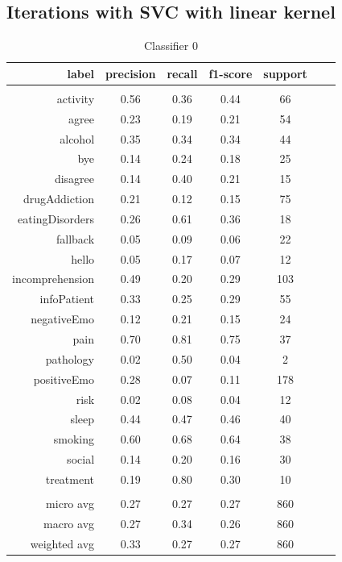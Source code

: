 \documentclass[11pt]{article}
\begin{document}
\subsection{Iterations with SVC with linear kernel}
\begin{table}[htb]
\begin{center}
\begin{tabular}{ |r|c|c|c|c|c|c| }
\hline
label 			& precision & recall & f1-score & support\\ \hline 
\\ \hline 
activity 		&  0.56 & 0.36 & 0.44 &   66\\ \hline 
agree 			&  0.23 & 0.19 & 0.21 &   54\\ \hline 
alcohol 		&  0.35 & 0.34 & 0.34 &   44\\ \hline 
bye 			&  0.14 & 0.24 & 0.18 &   25\\ \hline 
disagree 		&  0.14 & 0.40 & 0.21 &   15\\ \hline 
drugAddiction 	&  0.21 & 0.12 & 0.15 &   75\\ \hline 
eatingDisorders &  0.26 & 0.61 & 0.36 &   18\\ \hline 
fallback 		&  0.05 & 0.09 & 0.06 &   22\\ \hline 
hello 			&  0.05 & 0.17 & 0.07 &   12\\ \hline 
incomprehension &  0.49 & 0.20 & 0.29 &  103\\ \hline 
infoPatient 	&  0.33 & 0.25 & 0.29 &   55\\ \hline 
negativeEmo 	&  0.12 & 0.21 & 0.15 &   24\\ \hline 
pain 			&  0.70 & 0.81 & 0.75 &   37\\ \hline 
pathology 		&  0.02 & 0.50 & 0.04 &    2\\ \hline 
positiveEmo 	&  0.28 & 0.07 & 0.11 &  178\\ \hline 
risk 			&  0.02 & 0.08 & 0.04 &   12\\ \hline 
sleep 			&  0.44 & 0.47 & 0.46 &   40\\ \hline 
smoking 		&  0.60 & 0.68 & 0.64 &   38\\ \hline 
social 			&  0.14 & 0.20 & 0.16 &   30\\ \hline 
treatment		&  0.19 & 0.80 & 0.30 &   10\\ \hline 
\\ \hline 
micro avg 		&  0.27 & 0.27 & 0.27 &  860\\ \hline 
macro avg 		&  0.27 & 0.34 & 0.26 &  860\\ \hline 
weighted avg 	&  0.33 & 0.27 & 0.27 &  860\\ \hline 
\end{tabular}
\caption{Classifier 0}
\end{center}
\end{table}
\FloatBarrier
\end{document}
